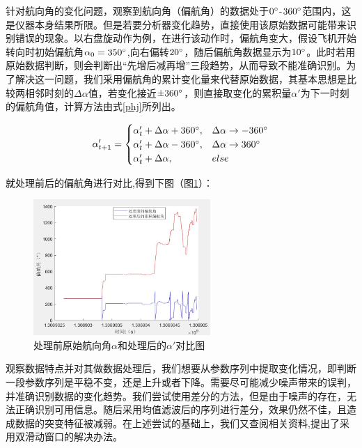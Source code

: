 \documentclass{my_paper}
\begin{document}
\newpage
针对航向角的变化问题，观察到航向角（偏航角）的数据处于$ 0\degree $-$ 360\degree $范围内，这是仪器本身结果所限。但是若要分析器变化趋势，直接使用该原始数据可能带来识别错误的现象。以右盘旋动作为例，在进行该动作时，偏航角变大，假设飞机开始转向时初始偏航角$\alpha_0=350\degree$,向右偏转$ 20\degree $，随后偏航角数据显示为$ 10\degree $。此时若用原始数据判断，则会判断出“先增后减再增”三段趋势，从而导致不能准确识别。为了解决这一问题，我们采用偏航角的累计变化量来代替原始数据，其基本思想是比较两相邻时刻的$ \Delta\alpha $值，若变化接近$ \pm 360\degree $，则直接取变化的累积量$ \alpha' $为下一时刻的偏航角值，计算方法由式\ref{phj}所列出。

\begin{equation}
    \alpha'_{t+1} = \begin{cases}
        \alpha'_{t} + \Delta \alpha+360\degree,&\Delta \alpha\to -360\degree \\
        \alpha'_{t} + \Delta \alpha-360\degree,&\Delta \alpha\to 360\degree \\
        \alpha'_{t} + \Delta \alpha,&else
    \end{cases}
    \label{phj}
\end{equation}

就处理前后的偏航角进行对比,得到下图（图\ref{hxj}）：

\begin {figure}[h]
\centering %
\includegraphics[width=0.6\textwidth]{phjt.jpg}
\caption{处理前原始航向角$\alpha$和处理后的$\alpha'$对比图} %
\label{hxj}
\end {figure}

观察数据特点并对其做数据处理后，我们想要从参数序列中提取变化情况，即判断一段参数序列是平稳不变，还是上升或者下降。需要尽可能减少噪声带来的误判，并准确识别数据的变化趋势。我们尝试使用差分的方法，但是由于噪声的存在，无法正确识别可用信息。随后采用均值滤波后的序列进行差分，效果仍然不佳，且造成数据的突变特征被减弱。在上述尝试的基础上，我们又查阅相关资料\cite{9},提出了采用双滑动窗口的解决办法。
\end{document}
